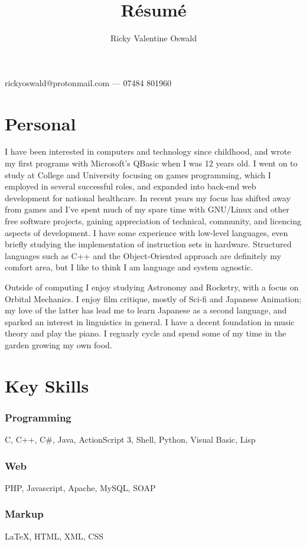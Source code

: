 \documentclass{article}
\makeatletter
\renewcommand{\maketitle}{
\begin{center}
{\huge\sc
\theauthor}

\vspace{.25em}

rickyoswald@protonmail.com --- 07484 801960
\end{center}
}
\makeatother
\begin{document}
\title{R\'esum\'e}
\author{Ricky Valentine Oswald}

\maketitle

\section{Personal}
I have been interested in computers and technology since childhood, and wrote my first programs with Microsoft's QBasic when I was 12 years old.  I went on to study at College and University focusing on games programming, which I employed in several successful roles, and expanded into back-end web development for national healthcare.  In recent years my focus has shifted away from games and I've spent much of my spare time with GNU/Linux and other free software projects, gaining appreciation of technical, community, and licencing aspects of development.  I have some experience with low-level languages, even briefly studying the implementation of instruction sets in hardware.  Structured languages such as C++ and the Object-Oriented approach are definitely my comfort area, but I like to think I am language and system agnostic.

Outside of computing I enjoy studying Astronomy and Rocketry, with a focus on Orbital Mechanics.  I enjoy film critique, mostly of Sci-fi and Japanese Animation; my love of the latter has lead me to learn Japanese as a second language, and sparked an interest in linguistics in general.  I have a decent foundation in music theory and play the piano.  I reguarly cycle and spend some of my time in the garden growing my own food.

\section{Key Skills}
\subsubsection{Programming}
C, C++, C\#, Java, ActionScript 3, Shell, Python, Visual Basic, Lisp
\subsubsection{Web}
PHP, Javascript, Apache, MySQL, SOAP
\subsubsection{Markup}
{\LaTeX}, HTML, XML, CSS
\end{document}
